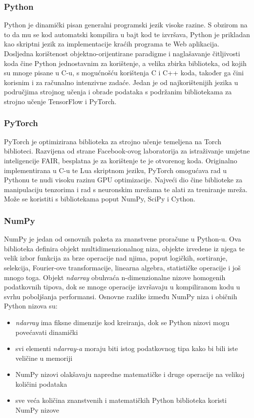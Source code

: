 \documentclass[times, utf8, diplomski]{fer}
\begin{document}
\subsubsection{Python}
Python je dinamički pisan generalni programski jezik visoke razine. S obzirom na to da mu se kod automatski kompilira u bajt kod te izvršava, Python je prikladan kao skriptni jezik za implementacije kraćih programa te Web aplikacija. Dosljedna korištenost objektno-orijentirane paradigme i naglašavanje čitljivosti koda čine Python jednostavnim za korištenje, a velika zbirka biblioteka, od kojih su mnoge pisane u C-u, s mogućnošću korištenja C i C++ koda, također ga čini korisnim i za računalno intenzivne zadaće. \cite{Python} Jedan je od najkorištenijih jezika u područjima strojnog učenja i obrade podataka s podržanim bibliotekama za strojno učenje TensorFlow i PyTorch.

\subsubsection{PyTorch}
PyTorch je optimizirana biblioteka za strojno učenje temeljena na Torch biblioteci. Razvijena od strane Facebook-ovog laboratorija za istraživanje umjetne inteligencije FAIR, besplatna je za korištenje te je otvorenog koda. Originalno implementirana u C-u te Lua skriptnom jeziku, PyTorch omogućava rad u Pythonu te nudi visoku razinu GPU optimizacije. Najveći dio čine biblioteke za manipulaciju tenzorima i rad s neuronskim mrežama te alati za treniranje mreža. Može se koristiti s bibliotekama poput NumPy, SciPy i Cython. \cite{Pytorch_article}

\subsubsection{NumPy}
NumPy je jedan od osnovnih paketa za znanstvene proračune u Python-u. Ova biblioteka definira objekt multidimenzionalnog niza, objekte izvedene iz njega te velik izbor funkcija za brze operacije nad njima, poput logičkih, sortiranje, selekcija, Fourier-ove transformacije, linearna algebra, statističke operacije i još mnogo toga.
Objekt \textit{ndarray} obuhvaća n-dimenzionalne nizove homogenih podatkovnih tipova, dok se mnoge operacije izvršavaju u kompiliranom kodu u svrhu poboljšanja performansi. Osnovne razlike između NumPy niza i običnih Python nizova su:
\begin{itemize}
    \item \textit{ndarray} ima fiksne dimenzije kod kreiranja, dok se Python nizovi mogu povećavati dinamički
    \item svi elementi \textit{ndarray-a} moraju biti istog podatkovnog tipa kako bi bili iste veličine u memoriji
    \item NumPy nizovi olakšavaju napredne matematičke i druge operacije na velikoj količini podataka
    \item sve veća količina znanstvenih i matematičkih Python biblioteka koristi NumPy nizove
    \cite{numpy}
\end{itemize}
\end{document}
